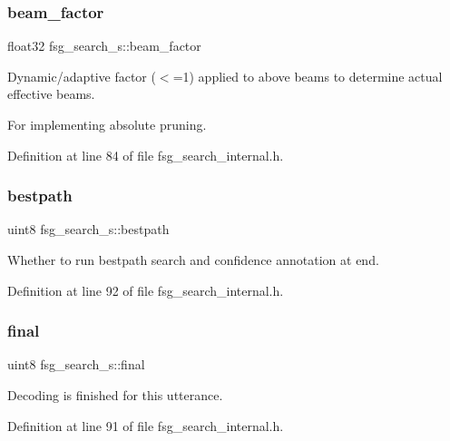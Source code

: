 \mbox{\label{structfsg__search__s_a8e86d9f82189f8429d71ee2f67ecaaa2}} 
\subsubsection{beam\+\_\+factor}
{\footnotesize\ttfamily float32 fsg\+\_\+search\+\_\+s\+::beam\+\_\+factor}



Dynamic/adaptive factor ($<$=1) applied to above beams to determine actual effective beams. 

For implementing absolute pruning. 

Definition at line 84 of file fsg\+\_\+search\+\_\+internal.\+h.

\mbox{\label{structfsg__search__s_aba7eff57919c5a1de55eab3a62ff055a}} 
\subsubsection{bestpath}
{\footnotesize\ttfamily uint8 fsg\+\_\+search\+\_\+s\+::bestpath}



Whether to run bestpath search and confidence annotation at end. 



Definition at line 92 of file fsg\+\_\+search\+\_\+internal.\+h.

\mbox{\label{structfsg__search__s_a5139d7ab35ae18407e06e78e1778f857}} 
\subsubsection{final}
{\footnotesize\ttfamily uint8 fsg\+\_\+search\+\_\+s\+::final}



Decoding is finished for this utterance. 



Definition at line 91 of file fsg\+\_\+search\+\_\+internal.\+h.

\mbox{\label{structfsg__search__s_acdac4164d14d531b14c11a823dd22893}} 
